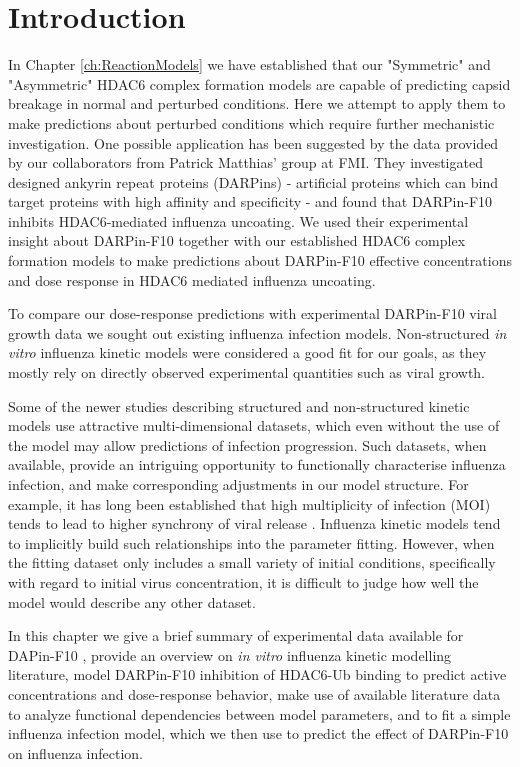 \section{Introduction}


In Chapter \ref{ch:ReactionModels} we have established that our "Symmetric" and "Asymmetric" HDAC6 complex formation models are capable of predicting capsid breakage in normal and perturbed conditions. Here we attempt to apply them to make predictions about perturbed conditions which require further mechanistic investigation. One possible application has been suggested by the data provided by our collaborators from Patrick Matthias' group at FMI. They investigated designed ankyrin repeat proteins (DARPins) - artificial proteins which can bind target proteins with high affinity and specificity - and found that DARPin-F10 inhibits HDAC6-mediated influenza uncoating. We used their experimental insight about DARPin-F10 together with our established HDAC6 complex formation models to make predictions about DARPin-F10 effective concentrations and dose response in HDAC6 mediated influenza uncoating.

To compare our dose-response predictions with experimental DARPin-F10 viral growth data we sought out existing influenza infection models. Non-structured \textit{in vitro} influenza kinetic models were considered a good fit for our goals, as they mostly rely on directly observed experimental quantities such as viral growth.

Some of the newer studies describing structured and non-structured kinetic models \cite{rudiger2019multiscale, schulze2009infection} use attractive multi-dimensional datasets, which even without the use of the model may allow predictions of infection progression. Such datasets, when available, provide an intriguing opportunity to functionally characterise influenza infection, and make corresponding adjustments in our model structure. For example, it has long been established that high multiplicity of infection (MOI) tends to lead to higher synchrony of viral release \cite{cairns1957asynchrony}. Influenza kinetic models tend to implicitly build such relationships into the parameter fitting. However, when the fitting dataset only includes a small variety of initial conditions, specifically with regard to initial virus concentration, it is difficult to judge how well the model would describe any other dataset.

In this chapter we give a brief summary of experimental data available for DAPin-F10 \cite{DarpinData}, provide an overview on \textit{in vitro} influenza kinetic modelling literature, model DARPin-F10 inhibition of HDAC6-Ub binding to predict active concentrations and dose-response behavior, make use of available literature data \cite{rudiger2019multiscale, schulze2009infection} to analyze functional dependencies between model parameters, and to fit a simple influenza infection model, which we then use to predict the effect of DARPin-F10 on influenza infection.

